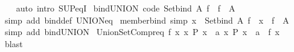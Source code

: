\begin{isabellebody}
%
\isadelimproof
\ \ %
\endisadelimproof
%
\isatagproof
{}\isamarkupfalse%
\ {\isacharparenleft}{\kern0pt}auto\ intro{\isacharbang}{\kern0pt}{\isacharcolon}{\kern0pt}\ SUP{\isacharunderscore}{\kern0pt}eqI{\isacharparenright}{\kern0pt}%
\endisatagproof
{\isafoldproof}%
%
\isadelimproof
\isanewline
%
\endisadelimproof
\isanewline
{}\isamarkupfalse%
\ bind{\isacharunderscore}{\kern0pt}UNION\ {\isacharbrackleft}{\kern0pt}code{\isacharbrackright}{\kern0pt}{\isacharcolon}{\kern0pt}\ {\isachardoublequoteopen}Set{\isachardot}{\kern0pt}bind\ A\ f\ {\isacharequal}{\kern0pt}\ {\isasymUnion}{\isacharparenleft}{\kern0pt}f\ {\isacharbackquote}{\kern0pt}\ A{\isacharparenright}{\kern0pt}{\isachardoublequoteclose}\isanewline
%
\isadelimproof
\ \ %
\endisadelimproof
%
\isatagproof
{}\isamarkupfalse%
\ {\isacharparenleft}{\kern0pt}simp\ add{\isacharcolon}{\kern0pt}\ bind{\isacharunderscore}{\kern0pt}def\ UNION{\isacharunderscore}{\kern0pt}eq{\isacharparenright}{\kern0pt}%
\endisatagproof
{\isafoldproof}%
%
\isadelimproof
\isanewline
%
\endisadelimproof
\isanewline
{}\isamarkupfalse%
\ member{\isacharunderscore}{\kern0pt}bind\ {\isacharbrackleft}{\kern0pt}simp{\isacharbrackright}{\kern0pt}{\isacharcolon}{\kern0pt}\ {\isachardoublequoteopen}x\ {\isasymin}\ Set{\isachardot}{\kern0pt}bind\ A\ f\ {\isasymlongleftrightarrow}\ x\ {\isasymin}\ {\isasymUnion}{\isacharparenleft}{\kern0pt}f\ {\isacharbackquote}{\kern0pt}\ A{\isacharparenright}{\kern0pt}{\isachardoublequoteclose}\isanewline
%
\isadelimproof
\ \ %
\endisadelimproof
%
\isatagproof
{}\isamarkupfalse%
\ {\isacharparenleft}{\kern0pt}simp\ add{\isacharcolon}{\kern0pt}\ bind{\isacharunderscore}{\kern0pt}UNION{\isacharparenright}{\kern0pt}%
\endisatagproof
{\isafoldproof}%
%
\isadelimproof
\isanewline
%
\endisadelimproof
\isanewline
{}\isamarkupfalse%
\ Union{\isacharunderscore}{\kern0pt}SetCompr{\isacharunderscore}{\kern0pt}eq{\isacharcolon}{\kern0pt}\ {\isachardoublequoteopen}{\isasymUnion}{\isacharbraceleft}{\kern0pt}f\ x{\isacharbar}{\kern0pt}\ x{\isachardot}{\kern0pt}\ P\ x{\isacharbraceright}{\kern0pt}\ {\isacharequal}{\kern0pt}\ {\isacharbraceleft}{\kern0pt}a{\isachardot}{\kern0pt}\ {\isasymexists}x{\isachardot}{\kern0pt}\ P\ x\ {\isasymand}\ a\ {\isasymin}\ f\ x{\isacharbraceright}{\kern0pt}{\isachardoublequoteclose}\isanewline
%
\isadelimproof
\ \ %
\endisadelimproof
%
\isatagproof
{}\isamarkupfalse%
\ blast%
\endisatagproof
{\isafoldproof}%
%
\isadelimproof
\isanewline
%
\endisadelimproof
\isanewline
{}\isamarkupfalse%

\end{isabellebody}
